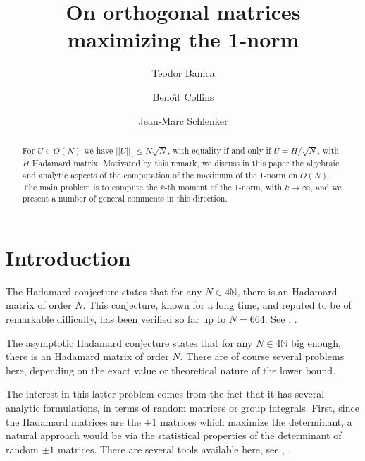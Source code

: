 \documentclass[12pt]{amsart}
\begin{document}
\title{On orthogonal matrices maximizing the 1-norm}

\author{Teodor Banica}
\address{T.B.: Institut of Mathematics at Toulouse, UMR CNRS 5219, Paul Sabatier University, 31062 Toulouse cedex 9, France. {\tt banica@math.univ-toulouse.fr}}

\author{Beno\^\i{}t Collins}
\address{B.C.: Department of Mathematics, Lyon 1 University, and University of Ottawa, 585 King Edward, Ottawa, ON K1N 6N5, Canada. {\tt bcollins@uottawa.ca}}

\author{Jean-Marc Schlenker}
\address{J.-M.S.: Institut of Mathematics at Toulouse, UMR CNRS 5219, Paul Sabatier University, 31062 Toulouse cedex 9, France. {\tt schlenker@math.univ-toulouse.fr}}

\begin{abstract}
For $U\in O(N)$ we have $||U||_1\leq N\sqrt{N}$, with equality if and only if $U=H/\sqrt{N}$, with $H$ Hadamard matrix. Motivated by this remark, we discuss in this paper the algebraic and analytic aspects of the computation of the maximum of the 1-norm on $O(N)$. The main problem is to compute the $k$-th moment of the 1-norm, with $k\to\infty$, and we present a number of general comments in this direction.
\end{abstract}


\maketitle

\section*{Introduction}

The Hadamard conjecture states that for any $N\in 4\mathbb N$, there is an Hadamard matrix of order $N$. This conjecture, known for a long time, and reputed to be of remarkable difficulty, has been verified so far up to $N=664$. See \cite{kta}, \cite{lgo}.

The asymptotic Hadamard conjecture states that for any $N\in 4\mathbb N$ big enough, there is an Hadamard matrix of order $N$. There are of course several problems here, depending on the exact value or theoretical nature of the lower bound. 

The interest in this latter problem comes from the fact that it has several analytic formulations, in terms of random matrices or group integrals. First, since the Hadamard matrices are the $\pm 1$ matrices which maximize the determinant, a natural approach would be via the statistical properties of the determinant of random $\pm 1$ matrices. There are several tools available here, see \cite{nra}, \cite{tvu}.
\end{document}

